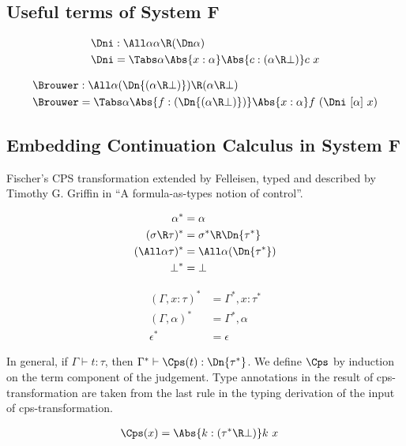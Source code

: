 \documentclass{amsart}
\begin{document}
\FRules

\subsection{Useful terms of System F}
\label{sec:f-terms}

\begin{align*}
\Dni & : \All\alpha \alpha \R (\Dn\alpha) \\
\Dni & = \Tabs\alpha \Abs{x:\alpha}
           \Abs{c : (\alpha \R \bot)} c~x
\end{align*}

\begin{align*}
\Brouwer & : \All\alpha (\Dn{(\alpha\R\bot)}) \R (\alpha \R \bot) \\
\Brouwer & = \Tabs\alpha \Abs{f:(\Dn{(\alpha\R\bot)})}
           \Abs{x:\alpha} f~(\Dni~[\alpha]~x)
\end{align*}

\subsection{Embedding Continuation Calculus in System F}
\label{sec:cps}

Fischer's CPS transformation extended by Felleisen, typed and
described by Timothy G. Griffin in ``A formula-as-types notion of
control''.

\begin{align*}
\alpha^* & =
  \alpha
  \\
(\sigma \R \tau)^* & =
  \sigma^* \R \Dn{\tau^*}
  \\
(\All\alpha\tau)^* & =
  \All\alpha (\Dn{\tau^*})
  \\
\bot^* & =
  \bot
\end{align*}

\begin{align*}
(\Gamma, x:\tau)^* & =
  \Gamma^*, x:\tau^*
  \\
(\Gamma, \alpha)^* & =
  \Gamma^*, \alpha
  \\
\epsilon^* & =
  \epsilon
\end{align*}

In general, if $\Gamma \vdash t : \tau$, then
$\Gamma^* \vdash \Cps(t) : \Dn{\tau^*}$.
We define $\Cps$ by induction on the term component of the
judgement. Type annotations in the result of cps-transformation
are taken from the last rule in the typing derivation of the
input of cps-transformation.

\begin{align*}
\Cps(x)
& =
\Abs{k: (\tau^* \R \bot)} k~x
\end{align*}
\end{document}
